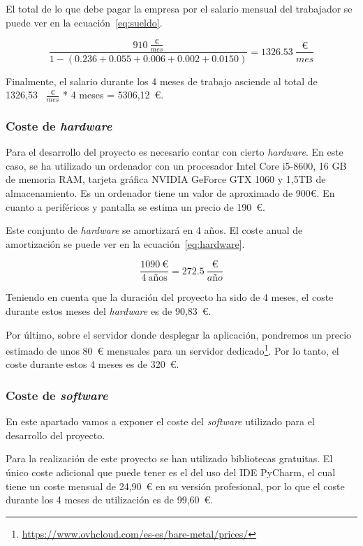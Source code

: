 El total de lo que debe pagar la empresa por el salario mensual del trabajador se puede ver en la ecuación~\ref{eq:sueldo}.

\begin{equation}\label{eq:sueldo}
\frac{910~\frac{\text{€}}{mes}}{1 - (0.236 + 0.055 + 0.006 + 0.002 + 0.0150)} = 1326.53~ \frac{\text{€}}{mes}
\end{equation}

Finalmente, el salario durante los 4 meses de trabajo asciende al total de 1326,53~ $\frac{\text{€}}{mes}$ * 4 meses = 5306,12~€.


\subsubsection{Coste de \textit{hardware}}
Para el desarrollo del proyecto es necesario contar con cierto \textit{hardware}.
En este caso, se ha utilizado un ordenador con un procesador Intel Core i5-8600, 16 GB de memoria RAM, tarjeta gráfica NVIDIA GeForce GTX 1060 y 1,5TB de almacenamiento.
Es un ordenador tiene un valor de aproximado de 900€. En cuanto a periféricos y pantalla se estima un precio de 190~€.

Este conjunto de \textit{hardware} se amortizará en 4 años. El coste anual de amortización se puede ver en la ecuación~\ref{eq:hardware}.

\begin{equation}\label{eq:hardware}
\frac{1090~\text{€}}{4~\text{años}} = 272.5~\frac{\text{€}}{año}
\end{equation}

Teniendo en cuenta que la duración del proyecto ha sido de 4 meses, el coste durante estos meses del \textit{hardware} es de 90,83~€.

Por último, sobre el servidor donde desplegar la aplicación, pondremos un precio estimado de unos 80~€ mensuales para un servidor dedicado\footnote{\url{https://www.ovhcloud.com/es-es/bare-metal/prices/}}. Por lo tanto, el coste durante estos 4 meses es de 320~€.

\subsubsection{Coste de \textit{software}}
En este apartado vamos a exponer el coste del \textit{software} utilizado para el desarrollo del proyecto.

Para la realización de este proyecto se han utilizado bibliotecas gratuitas. 
El único coste adicional que puede tener es el del uso del IDE PyCharm, el cual tiene un coste mensual de 24,90~€ en su versión profesional, por lo que el coste durante los 4 meses de utilización es de 99,60~€.

